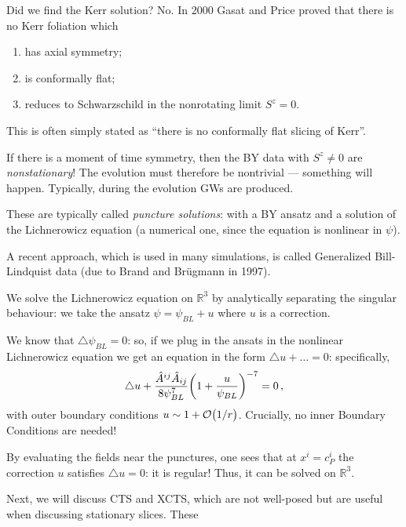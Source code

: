 \documentclass[main.tex]{subfiles}
\begin{document}
Did we find the Kerr solution? No. 
In 2000 Gasat and Price proved that there is no Kerr foliation which
\begin{enumerate}
    \item has axial symmetry;
    \item is conformally flat;
    \item reduces to Schwarzschild in the nonrotating limit \(S^{z} = 0\). 
\end{enumerate}

This is often simply stated as ``there is no conformally flat slicing of Kerr''.

If there is a moment of time symmetry, then the BY data with \(S^{z} \neq 0\) are \emph{nonstationary}! 
The evolution must therefore be nontrivial --- something will happen. 
Typically, during the evolution GWs are produced.  

These are typically called \emph{puncture solutions}: with a BY ansatz and a solution of the Lichnerowicz equation (a numerical one, since the equation is nonlinear in \(\psi \)). 

A recent approach, which is used in many simulations, is called Generalized Bill-Lindquist data (due to Brand and Brügmann in 1997). 

We solve the Lichnerowicz equation on \(\mathbb{R}^3\) by analytically separating the singular behaviour: we take the ansatz \(\psi = \psi_{BL} + u\) where \(u\) is a correction. 

We know that \(\triangle \psi_{BL} = 0\): so, if we plug in the ansats in the nonlinear Lichnerowicz equation we get an equation in the form \(\triangle u + \dots = 0\): specifically, 
%
\begin{align}
\triangle u + \frac{\hat{A}^{ij} \hat{A}_{ij}}{8 \psi_{BL}^{7}} \qty(1 + \frac{u}{\psi_{BL}})^{-7}= 0
\,,
\end{align}
%
with outer boundary conditions \(u \sim 1 + \order{1/r}\). 
Crucially, no inner Boundary Conditions are needed! 

By evaluating the fields near the punctures, one sees that at \(x^{i} = c_P^{i}\) the correction \(u\) satisfies \(\triangle u = 0\): it is regular! 
Thus, it can be solved on \(\mathbb{R}^3\). 

Next, we will discuss CTS and XCTS, which are not well-posed but are useful when discussing stationary slices. 
These 
\end{document}
